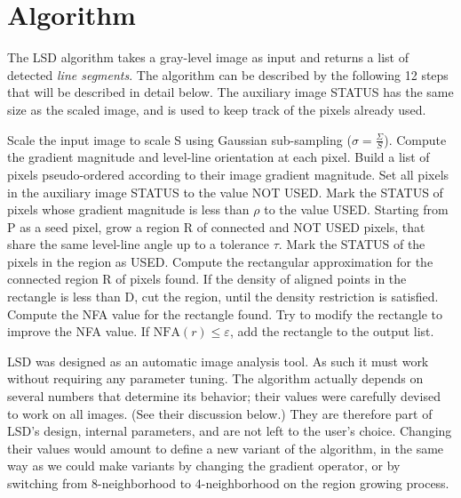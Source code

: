 \documentclass{ipol}
\begin{document}
\section{Algorithm}

The LSD algorithm takes a gray-level image as input and returns a list
of detected \emph{line segments}. The algorithm can be described by
the following 12 steps that will be described in detail below. The
auxiliary image STATUS has the same size as the scaled image, and is
used to keep track of the pixels already used.

\begin{algorithm}
Scale the input image to scale S using Gaussian sub-sampling
  ($\sigma=\frac{\Sigma}{S}$).\;
Compute the gradient magnitude and level-line orientation at each pixel.\;
Build a list of pixels pseudo-ordered according to their
  image gradient magnitude.\;
Set all pixels in the auxiliary image STATUS to the value NOT USED.\;
Mark the STATUS of pixels whose gradient magnitude is less than
  $\rho$ to the value USED.\;
  {
    Starting from P as a seed pixel, grow a region R of connected
      and NOT USED pixels, that share the same level-line angle
      up to a tolerance $\tau$. Mark the STATUS of the pixels
      in the region as USED.\;
    Compute the rectangular approximation for the connected region R
      of pixels found.\;
    If the density of aligned points in the rectangle is less than D,
      cut the region, until the density restriction is satisfied.\;
    Compute the NFA value for the rectangle found.\;
    Try to modify the rectangle to improve the NFA value.\;
    If $\textrm{NFA}(r) \leq \varepsilon$,
      add the rectangle to the output list.\;
  }
\end{algorithm}

LSD was designed as an automatic image analysis tool. As such it must
work without requiring any parameter tuning. The algorithm actually
depends on several numbers that determine its behavior; their values
were carefully devised to work on all images. (See their discussion
below.) They are therefore part of LSD's design, internal parameters,
and are not left to the user's choice. Changing their values would
amount to define a new variant of the algorithm, in the same way as we
could make variants by changing the gradient operator, or by switching
from 8-neighborhood to 4-neighborhood on the region growing process.
\end{document}
